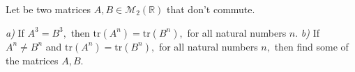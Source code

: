 Let be two matrices $ A,B\in\mathcal{M}_2\left( \mathbb{R} \right) $ that don’t commute.

\textit{a)} If $ A^3=B^3, $ then $ \text{tr} \left( A^n \right) =\text{tr} \left( B^n \right) ,  $ for all natural numbers $ n. $
\textit{b)} If $ A^n\neq B^n $ and $ \text{tr} \left( A^n \right) =\text{tr} \left( B^n \right) , $ for all natural numbers $ n, $ then find some of the matrices $ A,B. $